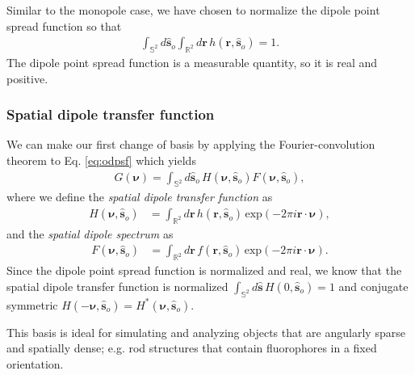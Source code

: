 \documentclass[]{osa-article}
\providecommand{\mb}[1]{\mathbf{#1}}
\providecommand{\so}{\mathbf{\hat{s}}_o}
\providecommand{\mh}[1]{\mathbf{\hat{#1}}}
\providecommand{\mbb}[1]{\mathbb{#1}}
\providecommand{\bs}[1]{\boldsymbol{#1}}
\providecommand{\bv}{\bs{\nu}}
\begin{document}
Similar to the monopole case, we have chosen to normalize the dipole point
spread function so that
\begin{align}
  \int_{\mbb{S}^2}d\so\int_{\mbb{R}^2}d\mb{r}\, h(\mb{r}, \so) = 1. 
\end{align}
The dipole point spread function is a measurable quantity, so it is real
and positive.

\subsubsection{Spatial dipole transfer function}
We can make our first change of basis by applying the Fourier-convolution
theorem to Eq. \ref{eq:odpsf} which yields
\begin{align}
G(\bv) = \int_{\mbb{S}^2}d\so\, H(\bv, \so)F(\bv, \so) \label{eq:odotf},
\end{align}
where we define the \textit{spatial dipole transfer function} as
  \begin{align}
  H(\bv, \so) &= \int_{\mbb{R}^2}d\mb{r}\, h(\mb{r}, \so)\, \text{exp}(-2\pi i\mb{r}\cdot\bv),
  \end{align}
  and the \textit{spatial dipole spectrum} as
  \begin{align}
  F(\bv, \so) &= \int_{\mbb{R}^2}d\mb{r}\, f(\mb{r}, \so)\, \text{exp}(-2\pi i\mb{r}\cdot\bv). 
  \end{align}
  Since the dipole point spread function is normalized and real, we know that
  the spatial dipole transfer function is normalized
  $\int_{\mbb{S}^2}d\mh{s}\, H(0, \so) = 1$ and conjugate symmetric
  $H(-\bv, \so) = H^*(\bv, \so)$.
  
  This basis is ideal for simulating and analyzing objects that are angularly
  sparse and spatially dense; e.g. rod structures that contain fluorophores in a
  fixed orientation.
\end{document}
